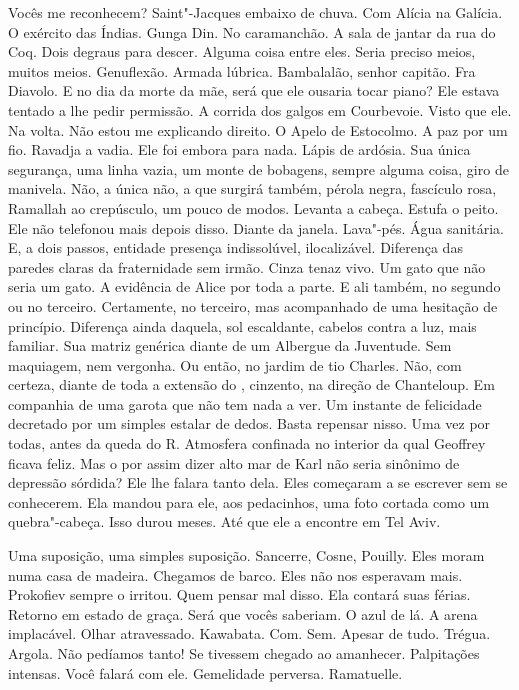 Vocês me reconhecem? Saint"-Jacques embaixo de chuva. Com Alícia na
Galícia. O exército das Índias. Gunga Din. No caramanchão. A sala de
jantar da rua do Coq. Dois degraus para descer. Alguma coisa entre eles.
Seria preciso meios, muitos meios. Genuflexão. Armada lúbrica.
Bambalalão, senhor capitão. Fra Diavolo. E no dia da morte da mãe, será
que ele ousaria tocar piano? Ele estava tentado a lhe pedir permissão. A
corrida dos galgos em Courbevoie. Visto que ele. Na volta. Não estou me
explicando direito. O Apelo de Estocolmo. A paz por um fio. Ravadja a
vadia. Ele foi embora para nada. Lápis de ardósia. Sua única segurança,
uma linha vazia, um monte de bobagens, sempre alguma coisa, giro de
manivela. Não, a única não, a que surgirá também, pérola negra,
fascículo rosa, Ramallah ao crepúsculo, um pouco de modos. Levanta a
cabeça. Estufa o peito. Ele não telefonou mais depois disso. Diante da
janela. Lava"-pés. Água sanitária. E, a dois passos, entidade presença
indissolúvel, ilocalizável. Diferença das paredes claras da fraternidade
sem irmão. Cinza tenaz vivo. Um gato que não seria um gato. A evidência
de Alice por toda a parte. E ali também, no segundo ou no terceiro.
Certamente, no terceiro, mas acompanhado de uma hesitação de princípio.
Diferença ainda daquela, sol escaldante, cabelos contra a luz, mais
familiar. Sua matriz genérica diante de um Albergue da Juventude. Sem
maquiagem, nem vergonha. Ou então, no jardim de tio Charles. Não, com
certeza, diante de toda a extensão do , cinzento, na direção de
Chanteloup. Em companhia de uma garota que não tem nada a ver. Um
instante de felicidade decretado por um simples estalar de dedos. Basta
repensar nisso. Uma vez por todas, antes da queda do R. Atmosfera
confinada no interior da qual Geoffrey ficava feliz. Mas o por assim
dizer alto mar de Karl não seria sinônimo de depressão sórdida? Ele lhe
falara tanto dela. Eles começaram a se escrever sem se conhecerem. Ela
mandou para ele, aos pedacinhos, uma foto cortada como um quebra"-cabeça.
Isso durou meses. Até que ele a encontre em Tel Aviv.

Uma suposição, uma simples suposição. Sancerre, Cosne, Pouilly. Eles
moram numa casa de madeira. Chegamos de barco. Eles não nos esperavam
mais. Prokofiev sempre o irritou. Quem pensar mal disso. Ela contará
suas férias. Retorno em estado de graça. Será que vocês saberiam. O azul
de lá. A arena implacável. Olhar atravessado. Kawabata. Com. Sem. Apesar
de tudo. Trégua. Argola. Não pedíamos tanto! Se tivessem chegado ao
amanhecer. Palpitações intensas. Você falará com ele. Gemelidade
perversa. Ramatuelle.

